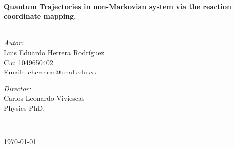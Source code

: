 \documentclass[12pt]{article}
\begin{document}
\begin{center}
 			\vspace*{1cm}																		%
\HRule \\[0.4cm]																	%
{ \huge \bfseries  Quantum Trajectories in non-Markovian system via the reaction coordinate mapping.}\\[0.4cm]	%
\HRule \\[1.5cm]																	%
\begin{minipage}{0.46\textwidth}													%
\begin{flushleft} \large															%
\emph{Autor:}\\	
Luis Eduardo Herrera Rodríguez\\
C.c: 1049650402\\ 
Email: leherrerar@unal.edu.co
\end{flushleft}																		%
\end{minipage}		
\begin{minipage}{0.52\textwidth}		
\vspace{-0.6cm}											%
\begin{flushright} \large															%
\emph{Director:} \\																	%
Carlos Leonardo Viviescas\\
Physics PhD.	\\
\end{flushright}																	%
\end{minipage}	
\vspace*{1cm}
 	
 		\\																		%
\vspace{2cm} 																				
\begin{center}																					
{\large \today}																	%
 			\end{center}												  						
\end{center}							 											
																					
\newpage																		
\end{document}
